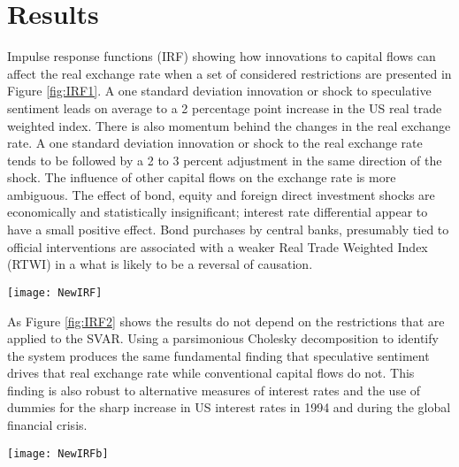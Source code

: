\documentclass[jrfm,communication,submit,moreauthors,pdftex]{Definitions/mdpi}
\begin{document}
 

\section{Results}

Impulse response functions (IRF) showing how innovations to capital flows can affect the real exchange rate when a set of considered restrictions are presented in Figure \ref{fig:IRF1}. A one standard deviation innovation or shock to speculative sentiment leads on average to a 2 percentage point increase in the US real trade weighted index. There is also momentum behind the changes in the real exchange rate.  A one standard deviation innovation or shock to the real exchange rate tends to be followed by a 2 to 3 percent adjustment in the same direction of the shock. The influence of other capital flows on the exchange rate is more ambiguous.  The effect of bond, equity and foreign direct investment shocks are economically and statistically insignificant; interest rate differential appear to have a small positive effect. Bond purchases by central banks, presumably tied to official interventions are associated with a weaker Real Trade Weighted Index (RTWI) in a what is likely to be a reversal of causation. 

\begin{sidewaysfigure}
\centering
\texttt{[image: NewIRF]}
\caption{Impulse Response Functions for RTWI: the effect of a one standard deviation shock of innovation to cumulative net bond (Bond), cumulative net equity (Equity), Net central bank purchase of bonds (CB), the real exchange rate (ER), Interest rate spread (Isp) and speculative sentiment (Spec). SVAR identification. }
\label{fig:IRF1}
\end{sidewaysfigure}


As Figure \ref{fig:IRF2} shows the results do not depend on the restrictions that are applied to the SVAR.  Using a parsimonious Cholesky decomposition to identify the system produces the same fundamental finding that speculative sentiment drives that real exchange rate while conventional capital flows do not.  This finding is also robust to alternative measures of interest rates and the use of dummies for the sharp increase in US interest rates in 1994 and during the global financial crisis. 

\begin{sidewaysfigure}
\centering
\texttt{[image: NewIRFb]}
\caption{Impulse Response Functions for RTWI: the effect of a one standard deviation shock of innovation to cumulative net bond (Bond), cumulative net equity (Equity), Net central bank purchase of bonds (CB), the real exchange rate (ER), Interest rate spread (Isp) and speculative sentiment (Spec). Cholesky decomposition. }
\label{fig:IRF2}
\end{sidewaysfigure}
\end{document}
